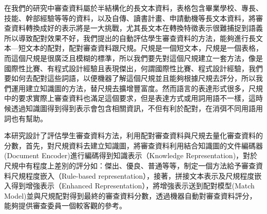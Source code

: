 在我們的研究中審查資料屬於半結構化的長文本資料，表格包含畢業學校、專長、技能、幹部經驗等等的資料，以及自傳、讀書計畫、申請動機等長文本資料，將審查資料轉換成好的表示將是一大挑戰，尤其長文本在轉換特徵表示很難捕捉到語義所以導致配對效果不好，我們提出的自動評估學生審查資料的方法，能夠進行長文本—短文本的配對，配對審查資料跟尺規。尺規是一個短文本，尺規是一個表格，而這個尺規是很廣泛且模糊的標準，所以我們要先對這個尺規建立一套方法，像是國際性比賽、有程式設計經驗且表現傑出，何謂國際性比賽、程式設計經驗，我們要如何去配對這些詞語，以便機器了解這個尺規並且能夠根據尺規去評分，所以我們運用建立知識圖的方法，替尺規去擴增豐富度。然而語言的表達形式很多，尺規中的要求實際上審查資料也滿足這個要求，但是表達方式或用詞用語不一樣，這時候透過知識圖得到得到表示會包含相關資訊，不但有利於配對，在消弭不同用語用詞也有幫助。

本研究設計了評估學生審查資料方法，利用配對審查資料與尺規去量化審查資料的分數，首先，對尺規資料去建立知識圖，將審查資料利用結合知識圖的文件編碼器(Document Encoder)進行編碼得到知識表示（Knowledge Representation)，對於尺規中有程度上差別的評分如：傑出、優良、普通等等，制定一個方法給予審查資料尺規程度嵌入（Rule-based representation），接著，拼接文本表示及尺規程度嵌入得到增強表示（Enhanced Representation），將增強表示送到配對模型(Match Model)並與尺規配對得到最終的審查資料分數，透過機器自動對審查資料評分，能夠提供審查委員一個較客觀的參考。